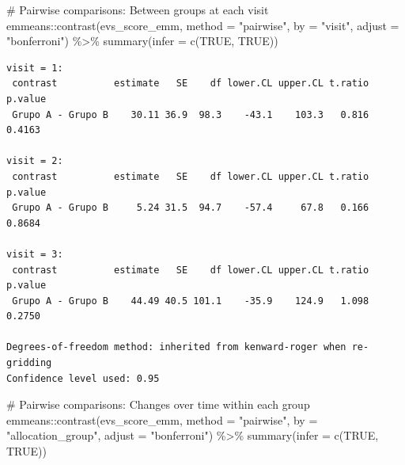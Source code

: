 \documentclass[
  letterpaper,
  DIV=11,
  numbers=noendperiod]{scrartcl}
\newenvironment{Shaded}{\begin{snugshade}}{\end{snugshade}}
\newcommand{\AttributeTok}[1]{\textcolor[rgb]{0.40,0.45,0.13}{#1}}
\newcommand{\CommentTok}[1]{\textcolor[rgb]{0.37,0.37,0.37}{#1}}
\newcommand{\ConstantTok}[1]{\textcolor[rgb]{0.56,0.35,0.01}{#1}}
\newcommand{\FunctionTok}[1]{\textcolor[rgb]{0.28,0.35,0.67}{#1}}
\newcommand{\NormalTok}[1]{\textcolor[rgb]{0.00,0.23,0.31}{#1}}
\newcommand{\SpecialCharTok}[1]{\textcolor[rgb]{0.37,0.37,0.37}{#1}}
\newcommand{\StringTok}[1]{\textcolor[rgb]{0.13,0.47,0.30}{#1}}
\begin{document}
\begin{Shaded}
\begin{Highlighting}[]
\CommentTok{\# Pairwise comparisons: Between groups at each visit}
\NormalTok{emmeans}\SpecialCharTok{::}\FunctionTok{contrast}\NormalTok{(evs\_score\_emm, }\AttributeTok{method =} \StringTok{"pairwise"}\NormalTok{, }\AttributeTok{by =} \StringTok{"visit"}\NormalTok{, }\AttributeTok{adjust =} \StringTok{"bonferroni"}\NormalTok{) }\SpecialCharTok{\%\textgreater{}\%} \FunctionTok{summary}\NormalTok{(}\AttributeTok{infer =} \FunctionTok{c}\NormalTok{(}\ConstantTok{TRUE}\NormalTok{, }\ConstantTok{TRUE}\NormalTok{))}
\end{Highlighting}
\end{Shaded}

\begin{verbatim}
visit = 1:
 contrast          estimate   SE    df lower.CL upper.CL t.ratio p.value
 Grupo A - Grupo B    30.11 36.9  98.3    -43.1    103.3   0.816  0.4163

visit = 2:
 contrast          estimate   SE    df lower.CL upper.CL t.ratio p.value
 Grupo A - Grupo B     5.24 31.5  94.7    -57.4     67.8   0.166  0.8684

visit = 3:
 contrast          estimate   SE    df lower.CL upper.CL t.ratio p.value
 Grupo A - Grupo B    44.49 40.5 101.1    -35.9    124.9   1.098  0.2750

Degrees-of-freedom method: inherited from kenward-roger when re-gridding 
Confidence level used: 0.95 
\end{verbatim}

\begin{Shaded}
\begin{Highlighting}[]
\CommentTok{\# Pairwise comparisons: Changes over time within each group}
\NormalTok{emmeans}\SpecialCharTok{::}\FunctionTok{contrast}\NormalTok{(evs\_score\_emm, }\AttributeTok{method =} \StringTok{"pairwise"}\NormalTok{, }\AttributeTok{by =} \StringTok{"allocation\_group"}\NormalTok{, }\AttributeTok{adjust =} \StringTok{"bonferroni"}\NormalTok{) }\SpecialCharTok{\%\textgreater{}\%} \FunctionTok{summary}\NormalTok{(}\AttributeTok{infer =} \FunctionTok{c}\NormalTok{(}\ConstantTok{TRUE}\NormalTok{, }\ConstantTok{TRUE}\NormalTok{))}
\end{Highlighting}
\end{Shaded}
\end{document}
